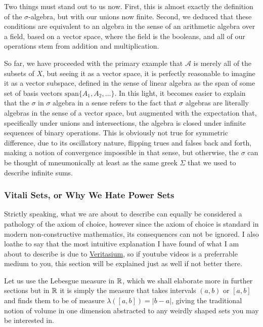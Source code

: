 \documentclass[11pt]{article}
\begin{document}
Two things must stand out to us now. First, this is almost exactly the definition of the $\sigma$-algebra, but with our unions now finite. Second, we deduced that these conditions are equivalent to an algebra in the sense of an arithmetic algebra over a field, based on a vector space, where the field is the booleans, and all of our operations stem from addition and multiplication. 

So far, we have proceeded with the primary example that $\mathcal A$ is merely all of the subsets of $X$, but seeing it as a vector space, it is perfectly reasonable to imagine it as a vector subspace, defined in the sense of linear algebra as the span of some set of basis vectors $\mathrm{span}\{A_1, A_2, \dots \}$. In this light, it becomes easier to explain that the $\sigma$ in $\sigma$ algebra in a sense refers to the fact that $\sigma$ algebras are literally algebras in the sense of a vector space, but augmented with the expectation that, specifically under unions and intersections, the algebra is closed under infinite sequences of binary operations. This is obviously not true for symmetric difference, due to its oscillatory nature, flipping trues and falses back and forth, making a notion of convergence impossible in that sense, but otherwise, the $\sigma$ can be thought of mneumonically at least as the same greek $\Sigma$ that we used to describe infinite sums.

\subsubsection{Vitali Sets, or Why We Hate Power Sets}

Strictly speaking, what we are about to describe can equally be considered a pathology of the axiom of choice, however since the axiom of choice is standard in modern non-constructive mathematics, its consequences can not be ignored. I also loathe to say that the most intuitive explanation I have found of what I am about to describe is due to \hyperlink{https://youtu.be/_cr46G2K5Fo&t=1042}{Veritasium}, so if youtube videos is a preferrable medium to you, this section will be explained just as well if not better there.

Let us use the Lebesgue measure in $\mathbb{R}$, which we shall elaborate more in further sections but in $\mathbb{R}$ it is simply the measure that takes intervals $(a,b)$ or $[a,b]$ and finds them to be of measure $\lambda([a,b]) = |b - a|$, giving the traditional notion of volume in one dimension abstracted to any weirdly shaped sets you may be interested in.
\end{document}
